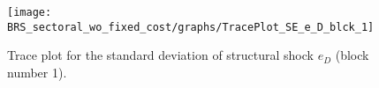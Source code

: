 \begin{figure}[H]
\centering
  \texttt{[image: BRS\_sectoral\_wo\_fixed\_cost/graphs/TracePlot\_SE\_e\_D\_blck\_1]}\\
    \caption{Trace plot for the standard deviation of structural shock ${e_D}$ (block number 1).}
\end{figure}
